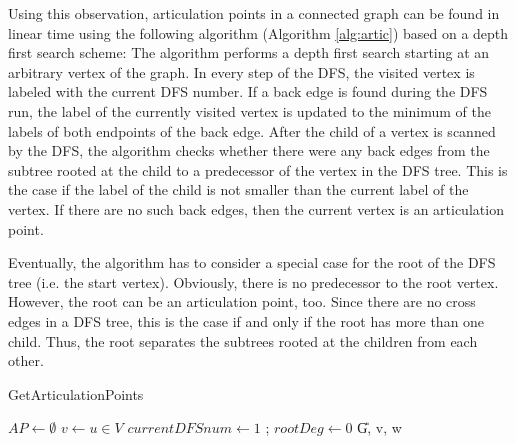\documentclass[]{article}
\begin{document}
Using this observation, articulation points in a connected graph can be found in linear time using the following algorithm (Algorithm \ref{alg:artic}) based on a depth first search scheme: The algorithm performs a depth first search starting at an arbitrary vertex of the graph. In every step of the DFS, the visited vertex is labeled with the current DFS number. If a back edge is found during the DFS run, the label of the currently visited vertex is updated to the minimum of the labels of both endpoints of the back edge. After the child of a vertex is scanned by the DFS, the algorithm checks whether there were any back edges from the subtree rooted at the child to a predecessor of the vertex in the DFS tree. This is the case if the label of the child is not smaller than the current label of the vertex. If there are no such back edges, then the current vertex is an articulation point.

Eventually, the algorithm has to consider a special case for the root of the DFS tree (i.e. the start vertex). Obviously, there is no predecessor to the root vertex. However, the root can be an articulation point, too. Since there are no cross edges in a DFS tree, this is the case if and only if the root has more than one child. Thus, the root separates the subtrees rooted at the children from each other.

\begin{algorithm}
	\caption{GetArticulationPoints}\label{alg:artic}
	\DontPrintSemicolon
	
	
	$AP \leftarrow \emptyset$\; 
	$v\leftarrow u\in V$
	$currentDFSnum \leftarrow 1$ ; $rootDeg \leftarrow 0$\;
	\U{G, v, w}	
	\;
	
\end{algorithm}
\end{document}
